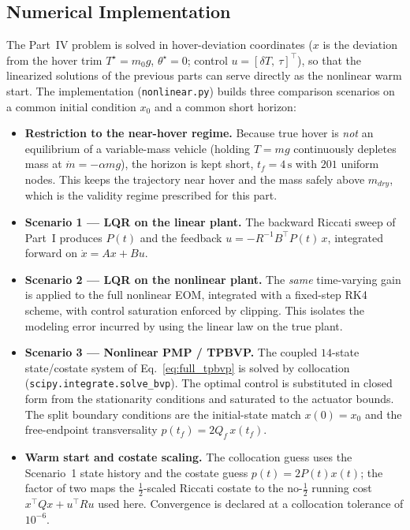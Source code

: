 \documentclass[letterpaper, 10 pt, conference]{ieeeconf}
\begin{document}
\subsection{Numerical Implementation}

The Part~IV problem is solved in hover-deviation coordinates ($x$ is the deviation from the hover trim $T^\star = m_0 g$, $\theta^\star=0$; control $u=[\delta T,\ \tau]^\top$), so that the linearized solutions of the previous parts can serve directly as the nonlinear warm start. The implementation (\texttt{nonlinear.py}) builds three comparison scenarios on a common initial condition $x_0$ and a common short horizon:

\begin{itemize}
    \item \textbf{Restriction to the near-hover regime.} Because true hover is \emph{not} an equilibrium of a variable-mass vehicle (holding $T=mg$ continuously depletes mass at $\dot m = -\alpha m g$), the horizon is kept short, $t_f = 4\,\mathrm{s}$ with $201$ uniform nodes. This keeps the trajectory near hover and the mass safely above $m_{dry}$, which is the validity regime prescribed for this part.
    \item \textbf{Scenario 1 — LQR on the linear plant.} The backward Riccati sweep of Part~I produces $P(t)$ and the feedback $u=-R^{-1}B^\top P(t)\,x$, integrated forward on $\dot x = Ax+Bu$.
    \item \textbf{Scenario 2 — LQR on the nonlinear plant.} The \emph{same} time-varying gain is applied to the full nonlinear EOM, integrated with a fixed-step RK4 scheme, with control saturation enforced by clipping. This isolates the modeling error incurred by using the linear law on the true plant.
    \item \textbf{Scenario 3 — Nonlinear PMP / TPBVP.} The coupled $14$-state state/costate system of Eq.~\eqref{eq:full_tpbvp} is solved by collocation (\texttt{scipy.integrate.solve\_bvp}). The optimal control is substituted in closed form from the stationarity conditions and saturated to the actuator bounds. The split boundary conditions are the initial-state match $x(0)=x_0$ and the free-endpoint transversality $p(t_f) = 2 Q_f\, x(t_f)$.
    \item \textbf{Warm start and costate scaling.} The collocation guess uses the Scenario~1 state history and the costate guess $p(t) = 2P(t)x(t)$; the factor of two maps the $\tfrac12$-scaled Riccati costate to the no-$\tfrac12$ running cost $x^\top Qx + u^\top Ru$ used here. Convergence is declared at a collocation tolerance of $10^{-6}$.
\end{itemize}
\end{document}
